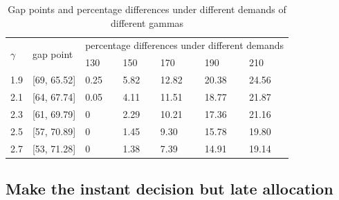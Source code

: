 \begin{table}[ht]
  \centering
  \caption{Gap points and percentage differences under different demands of different gammas}
\begin{tabular}{lllllll}
  \hline
  \multicolumn{1}{|l|}{\multirow{2}{*}{$\gamma$}} & \multicolumn{1}{l|}{\multirow{2}{*}{gap point}} & \multicolumn{5}{l|}{percentage differences under different demands}   \\ 
  \cline{3-7} 
  \multicolumn{1}{|l|}{}                      & \multicolumn{1}{l|}{}                    & \multicolumn{1}{l|}{130} & \multicolumn{1}{l|}{150} & \multicolumn{1}{l|}{170} & \multicolumn{1}{l|}{190} & \multicolumn{1}{l|}{210} \\ 
  \hline
  \multicolumn{1}{|l|}{1.9}  & \multicolumn{1}{l|}{[69, 65.52]}  & \multicolumn{1}{l|}{0.25}  & \multicolumn{1}{l|}{5.82}  & \multicolumn{1}{l|}{12.82} & \multicolumn{1}{l|}{20.38} & \multicolumn{1}{l|}{24.56} \\ 
  \hline                                    
  \multicolumn{1}{|l|}{2.1}  & \multicolumn{1}{l|}{[64, 67.74]}  & \multicolumn{1}{l|}{0.05}  & \multicolumn{1}{l|}{4.11}  & \multicolumn{1}{l|}{11.51} & \multicolumn{1}{l|}{18.77} & \multicolumn{1}{l|}{21.87} \\ 
  \hline           
  \multicolumn{1}{|l|}{2.3}  & \multicolumn{1}{l|}{[61, 69.79]}  & \multicolumn{1}{l|}{0}  & \multicolumn{1}{l|}{2.29}  & \multicolumn{1}{l|}{10.21} & \multicolumn{1}{l|}{17.36} & \multicolumn{1}{l|}{21.16} \\ 
  \hline           
  \multicolumn{1}{|l|}{2.5}  & \multicolumn{1}{l|}{[57, 70.89]}  & \multicolumn{1}{l|}{0}  & \multicolumn{1}{l|}{1.45}  & \multicolumn{1}{l|}{9.30} & \multicolumn{1}{l|}{15.78} & \multicolumn{1}{l|}{19.80} \\ 
  \hline          
  \multicolumn{1}{|l|}{2.7}  & \multicolumn{1}{l|}{[53, 71.28]}  & \multicolumn{1}{l|}{0}  & \multicolumn{1}{l|}{1.38}  & \multicolumn{1}{l|}{7.39} & \multicolumn{1}{l|}{14.91} & \multicolumn{1}{l|}{19.14} \\ 
  \hline            
\end{tabular}
\end{table}



\subsection{Make the instant decision but late allocation}






\newpage


